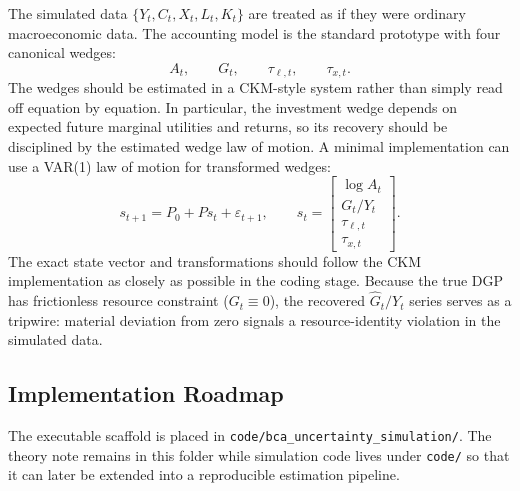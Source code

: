 The simulated data \(\{Y_t,C_t,X_t,L_t,K_t\}\) are treated as if they were
ordinary macroeconomic data. The accounting model is the standard prototype
with four canonical wedges:
\[
    A_t,\qquad
    G_t,\qquad
    \tau_{\ell,t},\qquad
    \tau_{x,t}.
\]
The wedges should be estimated in a CKM-style system rather than simply read
off equation by equation. In particular, the investment wedge depends on
expected future marginal utilities and returns, so its recovery should be
disciplined by the estimated wedge law of motion. A minimal implementation
can use a VAR(1) law of motion for transformed wedges:
\begin{equation}
    s_{t+1}
    =
    P_0 + P s_t + \varepsilon_{t+1},
    \qquad
    s_t
    =
    \begin{bmatrix}
        \log A_t \\
        G_t/Y_t \\
        \tau_{\ell,t} \\
        \tau_{x,t}
    \end{bmatrix}.
    \label{eq:ckm_wedge_law}
\end{equation}
The exact state vector and transformations should follow the CKM
implementation as closely as possible in the coding stage. Because the true
DGP has frictionless resource constraint (\(G_t\equiv 0\)), the recovered
\(\widehat{G}_t/Y_t\) series serves as a tripwire: material deviation from
zero signals a resource-identity violation in the simulated data.

\subsection{Implementation Roadmap}

The executable scaffold is placed in
\texttt{code/bca\_uncertainty\_simulation/}. The theory note remains in this
folder while simulation code lives under \texttt{code/} so that it can later
be extended into a reproducible estimation pipeline.

